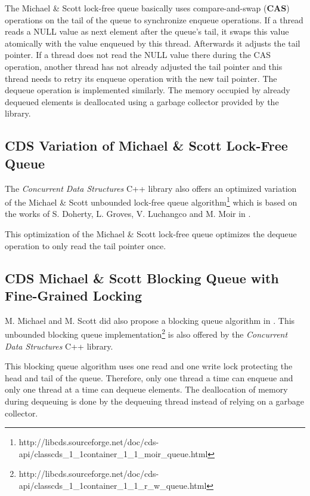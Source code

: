 	The Michael \& Scott lock-free queue basically uses compare-and-swap (\textbf{CAS}) operations on the tail of the queue to synchronize enqueue operations. If a thread reads a NULL value as next element after the queue's tail, it swaps this value atomically with the value enqueued by this thread. Afterwards it adjusts the tail pointer. If a thread does not read the NULL value there during the CAS operation, another thread has not already adjusted the tail pointer and this thread needs to retry its enqueue operation with the new tail pointer. The dequeue operation is implemented similarly. The memory occupied by already dequeued elements is deallocated using a garbage collector provided by the library.

\subsection[CDS MoirQueue]{CDS Variation of Michael \& Scott Lock-Free Queue} \label{subsec:cds-moir}

	The \textit{Concurrent Data Structures} C++ library also offers an optimized variation of the Michael \& Scott unbounded lock-free queue algorithm\footnote{http://libcds.sourceforge.net/doc/cds-api/classcds\_1\_1container\_1\_1\_moir\_queue.html} which is based on the works of S. Doherty, L. Groves, V. Luchangco and M. Moir in \cite{Doherty:2004}.
	
	This optimization of the Michael \& Scott lock-free queue optimizes the dequeue operation to only read the tail pointer once.

\subsection[CDS RWQueue]{CDS Michael \& Scott Blocking Queue with Fine-Grained Locking} \label{subsec:cds-rw}

	M. Michael and M. Scott did also propose a blocking queue algorithm in \cite{Michael:1996}. This unbounded blocking queue implementation\footnote{http://libcds.sourceforge.net/doc/cds-api/classcds\_1\_1container\_1\_1\_r\_w\_queue.html} is also offered by the \textit{Concurrent Data Structures} C++ library.
	
	This blocking queue algorithm uses one read and one write lock protecting the head and tail of the queue. Therefore, only one thread a time can enqueue and only one thread at a time can dequeue elements. The deallocation of memory during dequeuing is done by the dequeuing thread instead of relying on a garbage collector.

